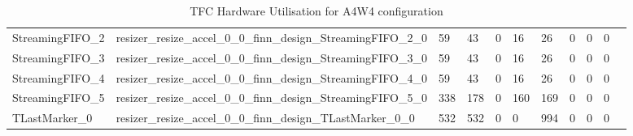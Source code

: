 \begin{landscape}
\begin{table}[!htb]
{\begin{tabular}{l|l|l|l|l|l|l|l|l|l|l}
   StreamingFIFO\_2                                        & resizer\_resize\_accel\_0\_0\_finn\_design\_StreamingFIFO\_2\_0                                        & 59         & 43         & 0       & 16   & 26    & 0      & 0      & 0            \\
   StreamingFIFO\_3                                        & resizer\_resize\_accel\_0\_0\_finn\_design\_StreamingFIFO\_3\_0                                        & 59         & 43         & 0       & 16   & 26    & 0      & 0      & 0            \\
   StreamingFIFO\_4                                        & resizer\_resize\_accel\_0\_0\_finn\_design\_StreamingFIFO\_4\_0                                        & 59         & 43         & 0       & 16   & 26    & 0      & 0      & 0            \\
   StreamingFIFO\_5                                        & resizer\_resize\_accel\_0\_0\_finn\_design\_StreamingFIFO\_5\_0                                        & 338        & 178        & 0       & 160  & 169   & 0      & 0      & 0            \\
   TLastMarker\_0                                          & resizer\_resize\_accel\_0\_0\_finn\_design\_TLastMarker\_0\_0                                          & 532        & 532        & 0       & 0    & 994   & 0      & 0      & 0            \\
\end{tabular}
}
\caption[TFC Hardware Utilisation A4W4]{TFC Hardware Utilisation for A4W4 configuration}
  \label{tab:TFCHardwareA4W4}
\end{table}


\end{landscape}
